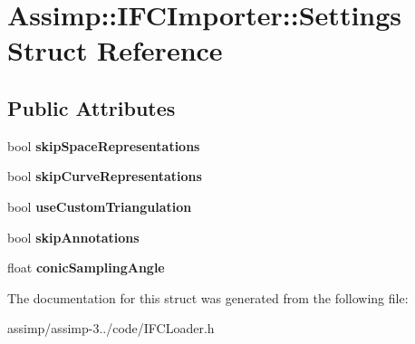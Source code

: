 \hypertarget{struct_assimp_1_1_i_f_c_importer_1_1_settings}{\section{Assimp\+:\+:I\+F\+C\+Importer\+:\+:Settings Struct Reference}
\label{struct_assimp_1_1_i_f_c_importer_1_1_settings}
}
\subsection*{Public Attributes}
\begin{DoxyCompactItemize}
\item 
\hypertarget{struct_assimp_1_1_i_f_c_importer_1_1_settings_a3bce378e6de2adcc83a2bdf4b157bd66}{bool {\bfseries skip\+Space\+Representations}}\label{struct_assimp_1_1_i_f_c_importer_1_1_settings_a3bce378e6de2adcc83a2bdf4b157bd66}

\item 
\hypertarget{struct_assimp_1_1_i_f_c_importer_1_1_settings_a91f58605116616614a4edbf40b6e7286}{bool {\bfseries skip\+Curve\+Representations}}\label{struct_assimp_1_1_i_f_c_importer_1_1_settings_a91f58605116616614a4edbf40b6e7286}

\item 
\hypertarget{struct_assimp_1_1_i_f_c_importer_1_1_settings_a4b209a0bd5baed9f604411bac9c6dd59}{bool {\bfseries use\+Custom\+Triangulation}}\label{struct_assimp_1_1_i_f_c_importer_1_1_settings_a4b209a0bd5baed9f604411bac9c6dd59}

\item 
\hypertarget{struct_assimp_1_1_i_f_c_importer_1_1_settings_a19949321597016717ae49fbc50e77af5}{bool {\bfseries skip\+Annotations}}\label{struct_assimp_1_1_i_f_c_importer_1_1_settings_a19949321597016717ae49fbc50e77af5}

\item 
\hypertarget{struct_assimp_1_1_i_f_c_importer_1_1_settings_a0522b1c4c1403d0327c829ed342921a8}{float {\bfseries conic\+Sampling\+Angle}}\label{struct_assimp_1_1_i_f_c_importer_1_1_settings_a0522b1c4c1403d0327c829ed342921a8}

\end{DoxyCompactItemize}


The documentation for this struct was generated from the following file\+:\begin{DoxyCompactItemize}
\item 
assimp/assimp-\/3../code/I\+F\+C\+Loader.\+h\end{DoxyCompactItemize}
